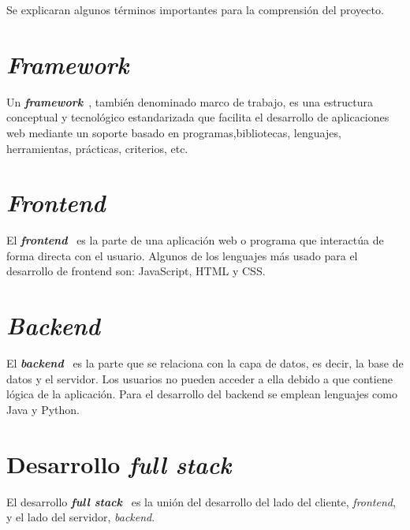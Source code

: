 
Se explicaran algunos términos importantes para la comprensión del proyecto.

\section{\textit{Framework}}
Un \textbf{\textit{framework}}~\cite{framework_definicion}, también denominado marco de trabajo, es una estructura conceptual y tecnológico estandarizada que facilita el desarrollo de aplicaciones web mediante un soporte basado en programas,bibliotecas, lenguajes, herramientas, prácticas, criterios, etc.

\section{\textit{Frontend}}
El \textbf{\textit{frontend}}~\cite{frontend_backend} es la parte de una aplicación web o programa que interactúa de forma directa con el usuario. Algunos de los lenguajes más usado para el desarrollo de frontend son: JavaScript, HTML y CSS.

\section{\textit{Backend}}
El \textbf{\textit{backend}}~\cite{frontend_backend} es la parte que se relaciona con la capa de datos, es decir, la base de datos y el servidor. Los usuarios no pueden acceder a ella debido a que contiene lógica de la aplicación. Para el desarrollo del backend se emplean lenguajes como Java y Python.

\section{Desarrollo \textit{full stack}}
El desarrollo \textbf{\textit{full stack}}~\cite{desarrollo_full_stack} es la unión del desarrollo del lado del cliente, \textit{frontend}, y el lado del servidor, \textit{backend}.